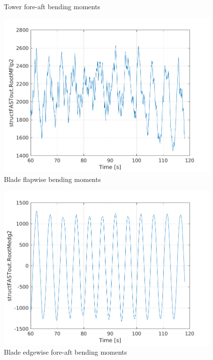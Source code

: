 \documentclass[12pt,t]{beamer}
\begin{document}
\begin{frame}
\begin{figure}[H]
\begin{minipage}{0.38\textwidth}
   \tiny
    Tower fore-aft bending moments
\end{minipage}
\begin{minipage}{0.38\textwidth}
  \centering
  \includegraphics[width=1\linewidth]{../CIP_6/FAST/Plots_ws5/RootMFlp2.png} \\
     \tiny
      Blade flapwise bending moments
\end{minipage}
\begin{minipage}{0.38\textwidth}
  \centering
  \includegraphics[width=1\linewidth]{../CIP_6/FAST/Plots_ws5/RootMedg2.png} \\
     \tiny
      Blade edgewise fore-aft bending moments
\end{minipage}
\end{figure}
\end{frame}
\end{document}
